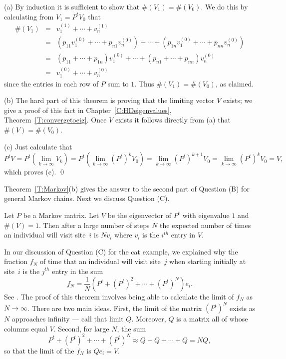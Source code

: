 \proof  (a) By induction it is sufficient to show that $\#(V_1)=\#(V_0)$.  We
do
this by calculating from $V_1 = P^tV_0$ that
\begin{eqnarray*}
\#(V_1) & = & v_1^{(1)} + \cdots + v_n^{(1)}\\
& = & (p_{11}v_1^{(0)} + \cdots + p_{n1}v_n^{(0)}) + \cdots +
	(p_{1n}v_1^{(0)} + \cdots + p_{nn}v_n^{(0)}) \\
& = & (p_{11}+ \cdots + p_{1n})v_1^{(0)}  + \cdots +
	(p_{n1} + \cdots + p_{nn})v_n^{(0)} \\
& = & v_1^{(0)}  + \cdots + v_n^{(0)}
\end{eqnarray*}
since the entries in each row of $P$ sum to $1$.  Thus $\#(V_1)=\#(V_0)$, as
claimed.

(b)	The hard part of this theorem is proving that the limiting vector $V$
exists; we give a proof of this fact in Chapter~\ref{C:HDeigenvalues},
Theorem~\ref{T:convergetoeig}.  Once $V$ exists it follows directly from (a)
that $\#(V)=\#(V_0)$.

(c)   	Just calculate that
\[
P^tV = P^t(\lim_{k\to\infty}V_k) = P^t(\lim_{k\to\infty}(P^t)^kV_0)
= \lim_{k\to\infty}(P^t)^{k+1}V_0 = \lim_{k\to\infty}(P^t)^kV_0 = V,
\]
which proves (c).   \qed

Theorem~\ref{T:Markov}(b) gives the answer to the second part of Question (B)
for general Markov chains.  Next we discuss Question (C).

\begin{thm} \label{T:ergodic}
Let $P$ be a Markov matrix.
Let $V$ be the eigenvector of $P^t$ with
eigenvalue $1$ and $\#(V)=1$.  Then after a large number of steps $N$ the
expected number of times an individual will visit site~$i$ is $Nv_i$ where
$v_i$ is the $i^{th}$ entry in $V$.
\end{thm}

  In our discussion of Question (C) for the
cat example, we explained why the fraction $f_N$ of time that an individual
will visit site~$j$ when starting initially at site~$i$ is the $j^{th}$ entry
in the sum
\[
f_N = \frac{1}{N}(P^t + (P^t)^2 + \cdots + (P^t)^N)e_i.
\]
See .  The proof of this theorem involves being able to calculate
the limit of $f_N$ as $N\to\infty$.  There are two main ideas.  First, the
limit of the matrix $(P^t)^N$ exists as $N$ approaches infinity --- call that
limit $Q$.  Moreover, $Q$ is a matrix all of whose columns equal $V$.
Second, for large $N$, the sum
\[
P^t + (P^t)^2 + \cdots + (P^t)^N \approx Q + Q + \cdots + Q = NQ,
\]
so that the limit of the $f_N$ is $Qe_i=V$.

